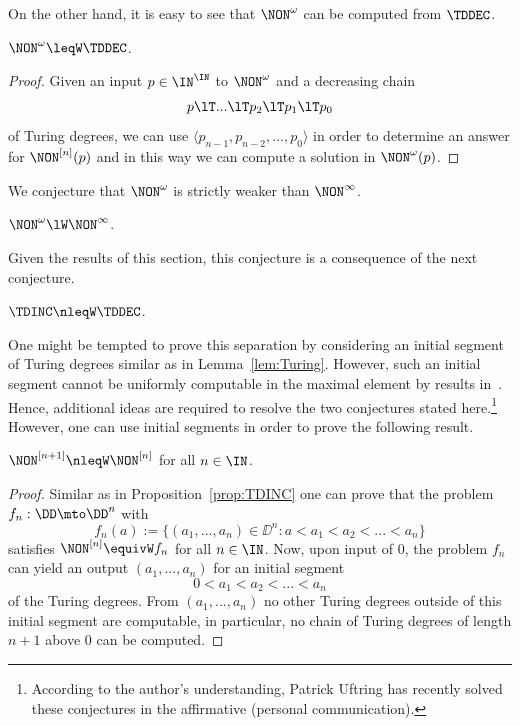 \noindent
On the other hand, it is easy to see that $\NON^\omega$ can be computed from $\TDDEC$.

\begin{prop}
$\NON^\omega\leqW\TDDEC$.
\end{prop}
\begin{proof}
Given an input $p\in\IN^\IN$ to $\NON^\omega$ and a decreasing chain 
\[p\lT ...\lT p_2\lT p_1\lT p_0\]
of Turing degrees,
we can use $\langle p_{n-1},p_{n-2},...,p_0\rangle$ in order to determine an answer for $\NON^{[n]}(p)$ and in this way we can
compute a solution in $\NON^\omega(p)$.
\end{proof}

\noindent
We conjecture that $\NON^\omega$ is strictly weaker than $\NON^\infty$.

\begin{conj}
\label{conjecture:NON-omega}
$\NON^\omega\lW\NON^\infty$.
\end{conj}

\noindent
Given the results of this section, this conjecture is a consequence of the next
conjecture.

\begin{conj}
$\TDINC\nleqW\TDDEC$.
\end{conj}

\noindent
One might be tempted to prove this separation by considering an initial segment of Turing
degrees similar as in Lemma~\ref{lem:Turing}. However, such an initial segment cannot
be uniformly computable in the maximal element by results in~\cite{Ish02}.
Hence, additional ideas are required to resolve the two conjectures stated here.\footnote{According to the author's understanding, Patrick Uftring has recently solved these conjectures in the affirmative (personal communication).}
However, one can use initial segments in order to prove the following result.

\begin{prop}
$\NON^{[n+1]}\nleqW\NON^{[n]}$ for all $n\in\IN$.
\end{prop}
\begin{proof}
Similar as in Proposition~\ref{prop:TDINC} one can prove that the problem $f_n:\DD\mto\DD^n$ with
\[f_n(a):=\{(a_1,...,a_n)\in\DD^n:a<a_1<a_2<...<a_n\}\]
satisfies $\NON^{[n]}\equivW f_n$ for all $n\in\IN$.
Now, upon input of $0$, the problem $f_n$ can yield an output $(a_1,...,a_n)$
for an initial segment
\[0<a_1<a_2<...<a_n\]
of the Turing degrees. From $(a_1,...,a_n)$ no other Turing degrees outside of this
initial segment are computable, in particular, no chain of Turing degrees of length $n+1$
above $0$ can be computed.
\end{proof}




